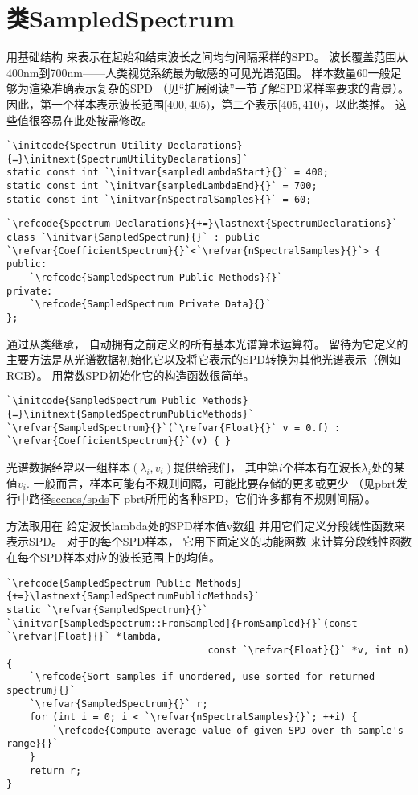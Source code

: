 \section{类SampledSpectrum}\label{sec:类SampledSpectrum}
用基础结构
来表示在起始和结束波长之间均匀间隔采样的SPD。
波长覆盖范围从400nm到700nm——人类视觉系统最为敏感的可见光谱范围。
样本数量60一般足够为渲染准确表示复杂的SPD
（见“扩展阅读”一节了解SPD采样率要求的背景）。
因此，第一个样本表示波长范围$[400,405)$，第二个表示$[405,410)$，以此类推。
这些值很容易在此处按需修改。
\begin{lstlisting}
`\initcode{Spectrum Utility Declarations}{=}\initnext{SpectrumUtilityDeclarations}`
static const int `\initvar{sampledLambdaStart}{}` = 400;
static const int `\initvar{sampledLambdaEnd}{}` = 700;
static const int `\initvar{nSpectralSamples}{}` = 60;
\end{lstlisting}
\begin{lstlisting}
`\refcode{Spectrum Declarations}{+=}\lastnext{SpectrumDeclarations}`
class `\initvar{SampledSpectrum}{}` : public `\refvar{CoefficientSpectrum}{}`<`\refvar{nSpectralSamples}{}`> {
public:
    `\refcode{SampledSpectrum Public Methods}{}`
private:
    `\refcode{SampledSpectrum Private Data}{}`
};
\end{lstlisting}

通过从类继承，
自动拥有之前定义的所有基本光谱算术运算符。
留待为它定义的主要方法是从光谱数据初始化它以及将它表示的SPD转换为其他光谱表示（例如RGB）。
用常数SPD初始化它的构造函数很简单。
\begin{lstlisting}
`\initcode{SampledSpectrum Public Methods}{=}\initnext{SampledSpectrumPublicMethods}`
`\refvar{SampledSpectrum}{}`(`\refvar{Float}{}` v = 0.f) : `\refvar{CoefficientSpectrum}{}`(v) { }
\end{lstlisting}

光谱数据经常以一组样本$(\lambda_i,v_i)$提供给我们，
其中第$i$个样本有在波长$\lambda_i$处的某值$v_i$.
一般而言，样本可能有不规则间隔，可能比要存储的更多或更少
（见pbrt发行中路径\href{https://pbrt.org/scenes-v3}{\ttfamily scenes/spds}下
pbrt所用的各种SPD，它们许多都有不规则间隔）。

方法取用在
给定波长{\ttfamily lambda}处的SPD样本值{\ttfamily v}数组
并用它们定义分段线性函数来表示SPD。
对于的每个SPD样本，
它用下面定义的功能函数
来计算分段线性函数在每个SPD样本对应的波长范围上的均值。
\begin{lstlisting}
`\refcode{SampledSpectrum Public Methods}{+=}\lastnext{SampledSpectrumPublicMethods}`
static `\refvar{SampledSpectrum}{}` `\initvar[SampledSpectrum::FromSampled]{FromSampled}{}`(const `\refvar{Float}{}` *lambda,
                                   const `\refvar{Float}{}` *v, int n) {
    `\refcode{Sort samples if unordered, use sorted for returned spectrum}{}`
    `\refvar{SampledSpectrum}{}` r;
    for (int i = 0; i < `\refvar{nSpectralSamples}{}`; ++i) {
        `\refcode{Compute average value of given SPD over th sample's range}{}`
    }
    return r;
}
\end{lstlisting}

